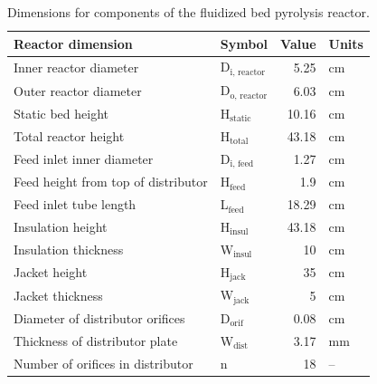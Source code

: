 \begin{table}[H]
    \centering
    \caption{Dimensions for components of the fluidized bed pyrolysis reactor.}
    \label{tab:dimensions}
    \begin{tabular}{llrl}
        \toprule
        Reactor dimension & Symbol & Value & Units \\
        \midrule
        Inner reactor diameter              & D$_{\textrm{i, reactor}}$  & 5.25  & cm \\
        Outer reactor diameter              & D$_{\textrm{o, reactor}}$  & 6.03  & cm \\
        Static bed height                   & H$_{\textrm{static}}$      & 10.16 & cm \\
        Total reactor height                & H$_{\textrm{total}}$       & 43.18 & cm \\
        Feed inlet inner diameter           & D$_{\textrm{i, feed}}$     & 1.27  & cm \\
        Feed height from top of distributor & H$_{\textrm{feed}}$        & 1.9   & cm \\
        Feed inlet tube length              & L$_{\textrm{feed}}$        & 18.29 & cm \\
        Insulation height                   & H$_{\textrm{insul}}$       & 43.18 & cm \\
        Insulation thickness                & W$_{\textrm{insul}}$       & 10    & cm \\
        Jacket height                       & H$_{\textrm{jack}}$        & 35    & cm \\
        Jacket thickness                    & W$_{\textrm{jack}}$        & 5     & cm \\
        Diameter of distributor orifices    & D$_{\textrm{orif}}$        & 0.08  & cm \\
        Thickness of distributor plate      & W$_{\textrm{dist}}$        & 3.17  & mm \\
        Number of orifices in distributor   & n                          & 18    & -- \\
        \bottomrule
    \end{tabular}
\end{table}

